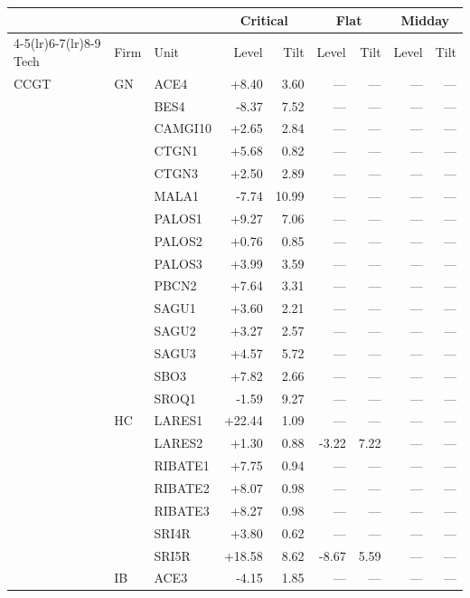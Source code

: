 \begin{tabular}{l l l r r r r r r}
\toprule
 & & & \multicolumn{2}{c}{Critical} & \multicolumn{2}{c}{Flat} & \multicolumn{2}{c}{Midday} \\
\cmidrule(lr){4-5}\cmidrule(lr){6-7}\cmidrule(lr){8-9}
Tech & Firm & Unit & Level & Tilt & Level & Tilt & Level & Tilt \\
\midrule
CCGT & GN & ACE4 & +8.40 & 3.60 & --- & --- & --- & --- \\
 &  & BES4 & -8.37 & 7.52 & --- & --- & --- & --- \\
 &  & CAMGI10 & +2.65 & 2.84 & --- & --- & --- & --- \\
 &  & CTGN1 & +5.68 & 0.82 & --- & --- & --- & --- \\
 &  & CTGN3 & +2.50 & 2.89 & --- & --- & --- & --- \\
 &  & MALA1 & -7.74 & 10.99 & --- & --- & --- & --- \\
 &  & PALOS1 & +9.27 & 7.06 & --- & --- & --- & --- \\
 &  & PALOS2 & +0.76 & 0.85 & --- & --- & --- & --- \\
 &  & PALOS3 & +3.99 & 3.59 & --- & --- & --- & --- \\
 &  & PBCN2 & +7.64 & 3.31 & --- & --- & --- & --- \\
 &  & SAGU1 & +3.60 & 2.21 & --- & --- & --- & --- \\
 &  & SAGU2 & +3.27 & 2.57 & --- & --- & --- & --- \\
 &  & SAGU3 & +4.57 & 5.72 & --- & --- & --- & --- \\
 &  & SBO3 & +7.82 & 2.66 & --- & --- & --- & --- \\
 &  & SROQ1 & -1.59 & 9.27 & --- & --- & --- & --- \\
 & HC & LARES1 & +22.44 & 1.09 & --- & --- & --- & --- \\
 &  & LARES2 & +1.30 & 0.88 & -3.22 & 7.22 & --- & --- \\
 &  & RIBATE1 & +7.75 & 0.94 & --- & --- & --- & --- \\
 &  & RIBATE2 & +8.07 & 0.98 & --- & --- & --- & --- \\
 &  & RIBATE3 & +8.27 & 0.98 & --- & --- & --- & --- \\
 &  & SRI4R & +3.80 & 0.62 & --- & --- & --- & --- \\
 &  & SRI5R & +18.58 & 8.62 & -8.67 & 5.59 & --- & --- \\
 & IB & ACE3 & -4.15 & 1.85 & --- & --- & --- & --- \\

\end{tabular}
